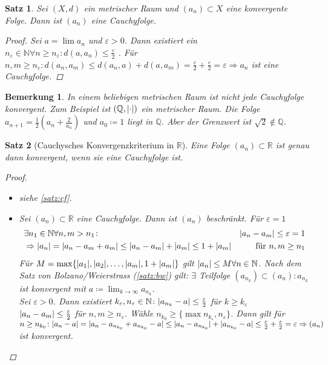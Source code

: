 \documentclass[ngerman,titlepage,twoside, parskip=half*]{scrreprt}
\newcommand*{\N}{\mathbb{N}}
\newcommand*{\Q}{\mathbb{Q}}
\newcommand*{\R}{\mathbb{R}}
\theoremstyle{break}
\newtheorem{theorem}{Satz}[section]
\theoremstyle{nonumberbreak}
\newtheorem{remark}{Bemerkung}
\newtheorem{proof}{Beweis:}
\DeclarePairedDelimiter{\abs}{\lvert}{\rvert}
\begin{document}
\begin{theorem}\label{satz:cf}
  Sei $(X,d)$ ein metrischer Raum und $(a_n)\subset X$ eine konvergente Folge.
  Dann ist $(a_n)$ eine Cauchyfolge.
  \begin{proof}
    Sei $a=\lim a_n$ und $\varepsilon>0$. Dann existiert ein
    $n_{\varepsilon}\in \N \forall n\geq n_{\varepsilon}\colon d(a,a_n)\leq
    \frac{\varepsilon}{2}$ . Für $n,m\geq n_{\varepsilon}\colon d(a_n,a_m)\leq
    d(a_n,a)+d(a,a_m)=\frac{\varepsilon}{2} +\frac{\varepsilon}{2}=\varepsilon
    \Rightarrow a_n$ ist eine Cauchyfolge.
  \end{proof}
\end{theorem}

\begin{remark}
  In einem beliebigen metrischen Raum ist \emph{nicht} jede Cauchyfolge
  konvergent. Zum Beispiel ist $(\Q,\abs{\cdot })$ ein metrischer Raum. Die
  Folge $a_{n+1}=\frac{1}{2}(a_n+\frac{2}{a_n})$ und $a_0\coloneqq1$ liegt in
  $\Q$. Aber der Grenzwert ist $\sqrt{2}\notin \Q$.
\end{remark}

\begin{theorem}[Cauchysches Konvergenzkriterium in $\R$]
\label{satz:CKonv}
  Eine Folge $(a_n)\subset \R$ ist genau dann konvergent, wenn sie eine
  Cauchyfolge ist.
  \begin{proof}
    \begin{itemize}
     \item["`$\Rightarrow$"'] siehe \autoref{satz:cf}.
     \item["`$\Leftarrow$"'] Sei $(a_n)\subset \R$ eine Cauchyfolge. Dann ist
      $(a_n)$ beschränkt. Für $\varepsilon=1$
    \begin{align*}
      & \exists n_1\in \N \forall n,m >n_1 \colon&\abs{a_n-a_m}\leq\varepsilon =1\\  
      &\Rightarrow \abs{a_n}=\abs{a_n-a_m+a_m}\leq \abs{a_n-a_m}+\abs{a_m}\leq 1+\abs{a_m}
      & \text{ für } n,m\geq n_1
    \end{align*}
    Für $M=\max\{\abs{a_1},\abs{a_2},\ldots, \abs{a_m}, 1+\abs{a_m}\}$ gilt $\abs{a_n}\leq
    M \forall n \in \N$. Nach dem Satz von Bolzano/Weierstrass
    (\autoref{satz:bw}) gilt: $\exists$ Teilfolge $(a_{n_k})\subset
    (a_n)\colon a_{n_k}$ ist konvergent mit $a\coloneqq\lim_{k\rightarrow \infty}
    a_{n_k}$.\\
    Sei $\varepsilon>0$. Dann existiert $k_{\varepsilon}, n_{\varepsilon} \in \N \colon\abs{a_{n_k}-a}\leq \frac{\varepsilon}{2}$
    für $k\geq k_{\varepsilon}$\\
    $\abs{a_n-a_m}\leq \frac{\varepsilon}{2}$ für $n,m \geq n_{\varepsilon}$. Wähle $n_{k_0}\geq \{\max n_{k_{\varepsilon}},
    n_{\varepsilon}\}$. Dann gilt für $n\geq n_{k_0}\colon\abs{a_n-a}=\abs{a_n-a_{n_{k_0}}+a_{n_{k_0}}-a}\leq 
    \abs{a_n-a_{n_{k_0}}}+\abs{a_{n_{k_0}}-a}\leq \frac{\varepsilon}{2}+\frac{\varepsilon}{2}=\varepsilon \Rightarrow (a_n)$
    ist konvergent.
\end{itemize}
  \end{proof}
\end{theorem}
\end{document}
